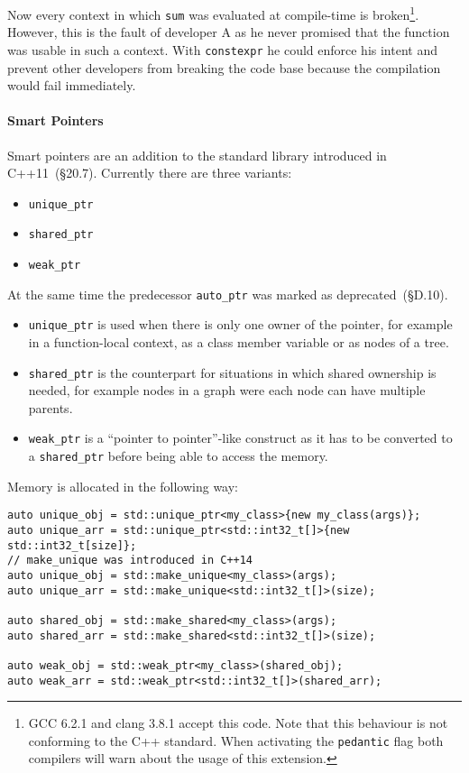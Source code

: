 \noindent Now every context in which \texttt{sum} was evaluated at compile-time is broken\footnote{GCC 6.2.1 and clang 3.8.1 accept this code. Note that this behaviour is not conforming to the C++ standard. When activating the \texttt{pedantic} flag both compilers will warn about the usage of this extension.}. However, this is the fault of developer A as he never promised that the function was usable in such a context. With \texttt{constexpr} he could enforce his intent and prevent other developers from breaking the code base because the compilation would fail immediately.

\paragraph{Smart Pointers}

Smart pointers are an addition to the standard library introduced in C++11~\cite{cpp11std}(§20.7). Currently there are three variants:
\begin{itemize}
\item \texttt{unique\_ptr}
\item \texttt{shared\_ptr}
\item \texttt{weak\_ptr}
\end{itemize}

At the same time the predecessor \texttt{auto\_ptr} was marked as deprecated~\cite{cpp11std}(§D.10).
\begin{itemize}
\item \texttt{unique\_ptr} is used when there is only one owner of the pointer, for example in a function-local context, as a class member variable or as nodes of a tree.

\item \texttt{shared\_ptr} is the counterpart for situations in which shared ownership is needed, for example nodes in a graph were each node can have multiple parents.

\item \texttt{weak\_ptr} is a ``pointer to pointer''-like construct as it has to be converted to a \texttt{shared\_ptr} before being able to access the memory.
\end{itemize}

Memory is allocated in the following way:
\begin{verbatim}
auto unique_obj = std::unique_ptr<my_class>{new my_class(args)};
auto unique_arr = std::unique_ptr<std::int32_t[]>{new std::int32_t[size]};
// make_unique was introduced in C++14
auto unique_obj = std::make_unique<my_class>(args);
auto unique_arr = std::make_unique<std::int32_t[]>(size);

auto shared_obj = std::make_shared<my_class>(args);
auto shared_arr = std::make_shared<std::int32_t[]>(size);

auto weak_obj = std::weak_ptr<my_class>(shared_obj);
auto weak_arr = std::weak_ptr<std::int32_t[]>(shared_arr);
\end{verbatim}

